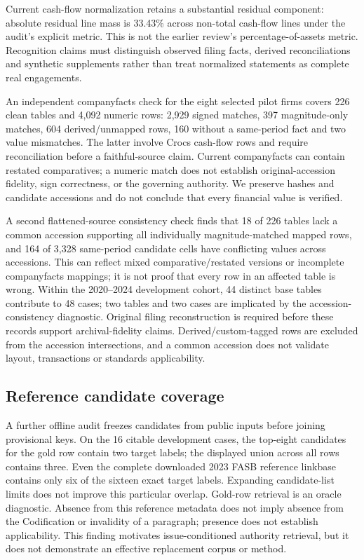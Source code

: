 \documentclass[11pt]{article}
\begin{document}
Current cash-flow normalization retains a substantial residual component: absolute residual line mass is 33.43\% across non-total cash-flow lines under the audit's explicit metric. This is not the earlier review's percentage-of-assets metric. Recognition claims must distinguish observed filing facts, derived reconciliations and synthetic supplements rather than treat normalized statements as complete real engagements.

An independent companyfacts check for the eight selected pilot firms covers 226 clean tables and 4,092 numeric rows: 2,929 signed matches, 397 magnitude-only matches, 604 derived/unmapped rows, 160 without a same-period fact and two value mismatches. The latter involve Crocs cash-flow rows and require reconciliation before a faithful-source claim. Current companyfacts can contain restated comparatives; a numeric match does not establish original-accession fidelity, sign correctness, or the governing authority. We preserve hashes and candidate accessions and do not conclude that every financial value is verified.

A second flattened-source consistency check finds that 18 of 226 tables lack a common accession supporting all individually magnitude-matched mapped rows, and 164 of 3,328 same-period candidate cells have conflicting values across accessions. This can reflect mixed comparative/restated versions or incomplete companyfacts mappings; it is not proof that every row in an affected table is wrong. Within the 2020--2024 development cohort, 44 distinct base tables contribute to 48 cases; two tables and two cases are implicated by the accession-consistency diagnostic. Original filing reconstruction is required before these records support archival-fidelity claims. Derived/custom-tagged rows are excluded from the accession intersections, and a common accession does not validate layout, transactions or standards applicability.

\subsection{Reference candidate coverage}
A further offline audit freezes candidates from public inputs before joining provisional keys. On the 16 citable development cases, the top-eight candidates for the gold row contain two target labels; the displayed union across all rows contains three. Even the complete downloaded 2023 FASB reference linkbase contains only six of the sixteen exact target labels. Expanding candidate-list limits does not improve this particular overlap. Gold-row retrieval is an oracle diagnostic. Absence from this reference metadata does not imply absence from the Codification or invalidity of a paragraph; presence does not establish applicability. This finding motivates issue-conditioned authority retrieval, but it does not demonstrate an effective replacement corpus or method.
\end{document}
